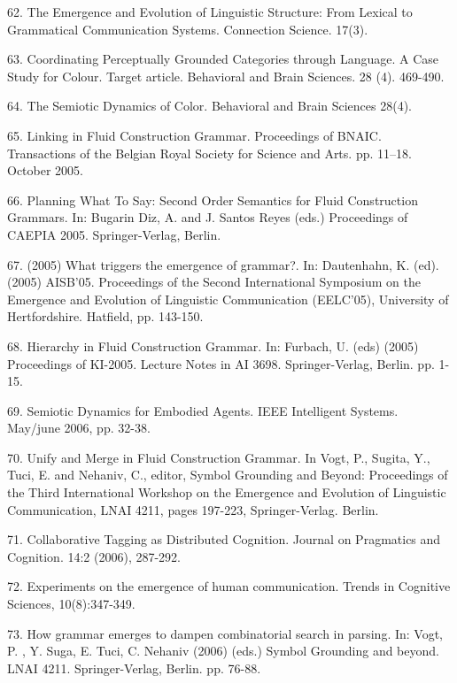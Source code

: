 62. \citet{Steels:05a} The Emergence and Evolution of Linguistic Structure: From Lexical to Grammatical Communication Systems. Connection Science. 17(3). 

63. \citet{Steels:05b} Coordinating Perceptually Grounded Categories through Language. A Case Study for Colour. Target article. Behavioral and Brain Sciences. 28 (4). 469-490. 

64. \citet{Steels:05c} The Semiotic Dynamics of Color. Behavioral and Brain Sciences 28(4). 

\enlargethispage{1\baselineskip}
65. \citet{Steels:05d} Linking in Fluid Construction Grammar. Proceedings of BNAIC. Transactions of the Belgian Royal Society for 
Science and Arts. pp. 11--18. October 2005.  

66. \citet{Steels:05e} Planning What To Say: Second Order Semantics for Fluid Construction Grammars. 
In: Bugarin Diz, A. and J. Santos Reyes (eds.) Proceedings of CAEPIA 2005. Springer-Verlag, Berlin. 

67. \citet{Steels:05f} (2005) What triggers the emergence of grammar?. In: Dautenhahn, K. (ed). (2005) AISB'05.  Proceedings of the 
Second International Symposium on the Emergence and Evolution of Linguistic Communication (EELC'05), University of Hertfordshire. Hatfield, pp. 143-150. 

68. \citet{Steels:05g} Hierarchy in Fluid Construction Grammar. 
In: Furbach, U. (eds) (2005) Proceedings of KI-2005. Lecture Notes in AI 3698. Springer-Verlag, Berlin. pp. 1-15. 

69. \citet{Steels:06a} Semiotic Dynamics for Embodied Agents. IEEE Intelligent Systems. May/june 2006, pp. 32-38. 

70. \citet{Steels:06b} Unify and Merge in Fluid Construction Grammar. In Vogt, P., Sugita, Y., Tuci, E. and Nehaniv, C., editor, Symbol Grounding and Beyond: Proceedings of the Third International Workshop on the Emergence and Evolution of Linguistic Communication, LNAI 4211, pages 197-223, Springer-Verlag. Berlin. 

71. \citet{Steels:06c} Collaborative Tagging as Distributed Cognition. Journal on 
Pragmatics and Cognition. 14:2 (2006), 287-292. 

72. \citet{Steels:06d} Experiments on the emergence of human communication. Trends in Cognitive Sciences, 10(8):347-349.

73. \citet{Steels:06e} How grammar emerges to dampen combinatorial search in parsing. In: Vogt, P. , Y. Suga, E. Tuci, C. Nehaniv (2006) (eds.) Symbol Grounding and beyond. LNAI 4211. Springer-Verlag, Berlin. pp. 76-88. 

